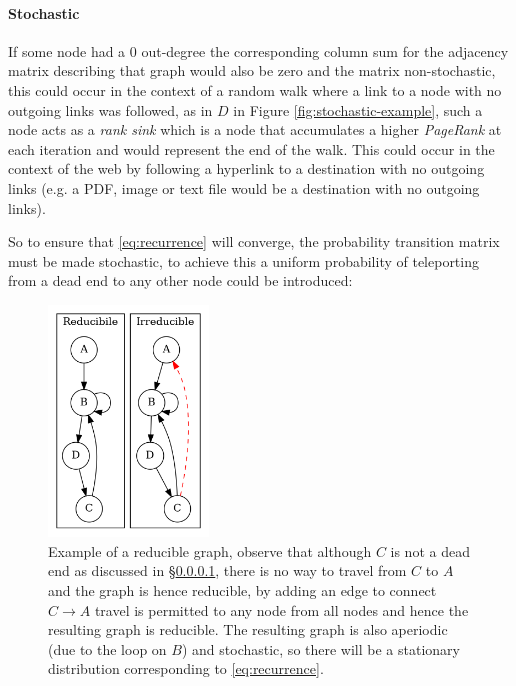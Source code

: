 \documentclass[11pt, twoside]{report}
\begin{document}
\paragraph{Stochastic}
\label{stochastic}
If some node had a 0 out-degree the corresponding column sum for the adjacency
matrix describing that graph would also be zero and the matrix non-stochastic,
this could occur in the context of a random walk where a link to a node with no
outgoing links was followed, as in \(D\) in Figure \ref{fig:stochastic-example},
such a node acts as a \textit{rank
  sink} \cite[\S 4.3]{langvilleGooglePageRankScience2012} which is a node that
accumulates a higher \textit{PageRank} at each iteration and would represent the
end of the walk. This could occur in the context of the web by following a
hyperlink to a destination with no outgoing links (e.g. a PDF, image or text
file would be a destination with no outgoing links).

So to ensure that \eqref{eq:recurrence} will converge, the probability
transition matrix must be made stochastic, to achieve this a uniform probability
of teleporting from a dead end to any other node could be introduced:


 \begin{figure}
     \includegraphics[width=0.38\textwidth]{media/dot/reducible_graph_example.dot.png}
     \caption{\label{irreducible-example}Example of a reducible graph, observe that although \(C\) is not a dead end as discussed in \S \ref{stochastic}, there is no way to travel from \(C\) to \(A\) and the graph is hence reducible, by adding an edge to connect \(C\rightarrow A\) travel is permitted to any node from all nodes and hence the resulting graph is reducible. The resulting graph is also aperiodic (due to the loop on \(B\)) and stochastic, so there will be a stationary distribution corresponding to \eqref{eq:recurrence}.}
 \end{figure}
\end{document}
